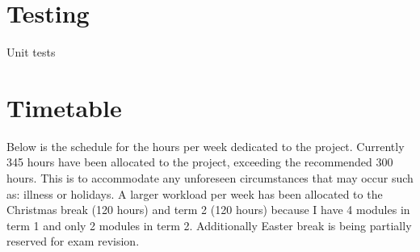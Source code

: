 \documentclass{article}
\begin{document}
\section{Testing}
Unit tests

\section{Timetable}

Below is the schedule for the hours per week dedicated to the project. Currently 345 hours have been allocated to the project, exceeding the recommended 300 hours. This is to accommodate any unforeseen circumstances that may occur such as: illness or holidays. A larger workload per week has been allocated to the Christmas break (120 hours) and term 2 (120 hours) because I have 4 modules in term 1 and only 2 modules in term 2. Additionally Easter break is being partially reserved for exam revision.

% 
\end{document}
